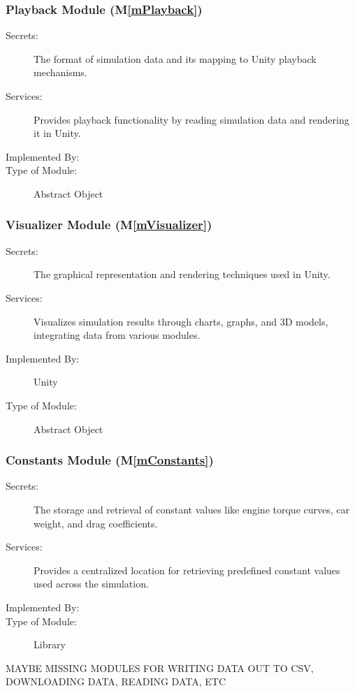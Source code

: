 \documentclass[12pt, titlepage]{article}
\newcommand{\mref}[1]{M\ref{#1}}
\begin{document}
\subsubsection{Playback Module (\mref{mPlayback})}

\begin{description}
\item[Secrets:] The format of simulation data and its mapping to Unity playback mechanisms.
\item[Services:] Provides playback functionality by reading simulation data and rendering it in Unity.
\item[Implemented By:] \progname{}
\item[Type of Module:] Abstract Object
\end{description}

\subsubsection{Visualizer Module (\mref{mVisualizer})}

\begin{description}
\item[Secrets:] The graphical representation and rendering techniques used in Unity.
\item[Services:] Visualizes simulation results through charts, graphs, and 3D models, integrating data from various modules.
\item[Implemented By:] Unity
\item[Type of Module:] Abstract Object
\end{description}

\subsubsection{Constants Module (\mref{mConstants})}

\begin{description}
\item[Secrets:] The storage and retrieval of constant values like engine torque curves, car weight, and drag coefficients.
\item[Services:] Provides a centralized location for retrieving predefined constant values used across the simulation.
\item[Implemented By:] \progname{}
\item[Type of Module:] Library
\end{description}

MAYBE MISSING MODULES FOR WRITING DATA OUT TO CSV, DOWNLOADING DATA, READING DATA, ETC
\end{document}
